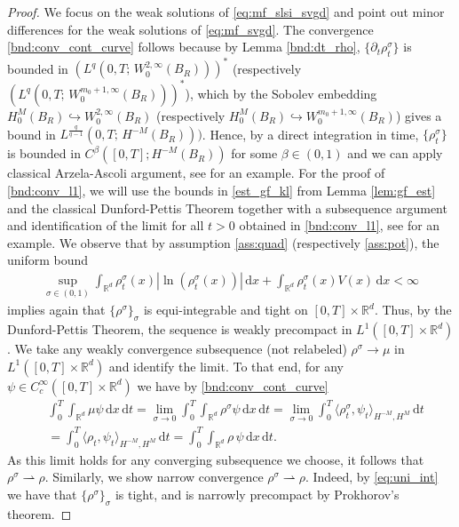 \documentclass[reqno, 11pt]{amsart}
\numberwithin{equation}{section}
\theoremstyle{definition}
\begin{document}
\begin{proof}
    We focus on the weak solutions of \eqref{eq:mf_slsi_svgd} and point out minor differences for the weak solutions of \eqref{eq:mf_svgd}. The convergence \ref{bnd:conv_cont_curve} follows because by Lemma \ref{bnd:dt_rho}, $\{\partial_t \rho^\sigma_t\}$ is bounded in $(L^q(0,T;\, W_0^{2,\infty}(B_R)))^\ast$ (respectively $(L^q(0,T;\, W_0^{m_0+1,\infty}(B_R)))^\ast$), which by the Sobolev embedding $H_0^{M}(B_R)\hookrightarrow W_0^{2,\infty}(B_R)$ (respectively $H_0^{M}(B_R)\hookrightarrow W_0^{m_0+1,\infty}(B_R)$) gives a bound in $L^{\frac{q}{q-1}}(0,T;\, H^{-M}(B_R)))$. Hence, by a direct integration in time, $\{\rho^\sigma_t\}$ is bounded in $C^{\beta}([0,T]; H^{-M}(B_R))$ for some $\beta \in (0,1)$ and we can apply classical Arzela-Ascoli argument, see \cite[Equation 4.18]{carrillo_skrzeczkowski_warnett_2024_stein} for an example. For the proof of \ref{bnd:conv_l1}, we will use the bounds in \ref{est_gf_kl} from Lemma \ref{lem:gf_est} and the classical Dunford-Pettis Theorem together with a subsequence argument and identification of the limit for all $t>0$ obtained in \ref{bnd:conv_l1}, see \cite[Equation 4.19]{carrillo_skrzeczkowski_warnett_2024_stein} for an example. We observe that by assumption \ref{ass:quad} (respectively \ref{ass:pot}), the uniform bound
    \begin{align}
        \label{eq:uni_int}
        \sup_{\sigma\in (0,1)}\int_{\mathbb{R}^{d}} \rho_t^\sigma(x) |\ln(\rho_t^\sigma(x))|\,\mathrm{d} x+\int_{\mathbb{R}^{d}} \rho_t^\sigma(x)V(x)\,\mathrm{d} x
        <\infty
    \end{align}
    implies again that $\{\rho^\sigma\}_{\sigma}$ is equi-integrable and tight on $[0,T]\times \mathbb{R}^{d}$. Thus, by the Dunford-Pettis Theorem, the sequence is weakly precompact in $L^1([0,T]\times \mathbb{R}^{d})$. We take any weakly convergence subsequence (not relabeled) $\rho^\sigma\to \mu$ in $L^1([0,T]\times \mathbb{R}^{d})$ and identify the limit. To that end, for any $\psi\in C_c^\infty([0,T]\times \mathbb{R}^{d})$ we have by \ref{bnd:conv_cont_curve}
    \begin{align*}
        &\int_0^T \int_{\mathbb{R}^{d}} \mu\psi\,\mathrm{d} x\,\mathrm{d} t
        =\lim_{\sigma\to 0}\int_0^T \int_{\mathbb{R}^{d}} \rho^\sigma\psi\,\mathrm{d} x\,\mathrm{d} t
        =\lim_{\sigma\to 0}\int_0^T\langle \rho_t^\sigma, \psi_t\rangle_{H^{-M},H^{M}}\,\mathrm{d} t\\
        &=\int_0^T\langle \rho_t, \psi_t\rangle_{H^{-M},H^{M}}\,\mathrm{d} t
        =\int_0^T \int_{\mathbb{R}^{d}}\rho\,  \psi\,\mathrm{d} x\,\mathrm{d} t.
    \end{align*}
    As this limit holds for any converging subsequence we choose, it follows that $\rho^\sigma\rightharpoonup \rho$. Similarly, we show narrow convergence $\rho^\sigma\rightharpoonup \rho$. Indeed, by \eqref{eq:uni_int} we have that $\{\rho^\sigma\}_\sigma$ is tight, and is narrowly precompact by Prokhorov's theorem.
\end{proof}
\end{document}
